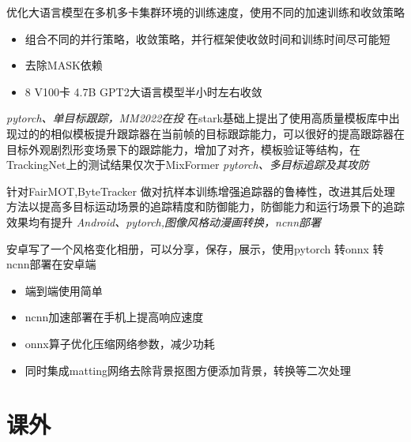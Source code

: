 \documentclass{uniquecv}
\begin{document}
优化大语言模型在多机多卡集群环境的训练速度，使用不同的加速训练和收敛策略
\begin{itemize}
  \item 组合不同的并行策略，收敛策略，并行框架使收敛时间和训练时间尽可能短
  \item 去除MASK依赖
  \item 8 V100卡 4.7B GPT2大语言模型半小时左右收敛
\end{itemize}
\textit{pytorch、单目标跟踪，MM2022在投}
\vspace{0.4ex}
在stark基础上提出了使用高质量模板库中出现过的的相似模板提升跟踪器在当前帧的目标跟踪能力，可以很好的提高跟踪器在目标外观剧烈形变场景下的跟踪能力，增加了对齐，模板验证等结构，在TrackingNet上的测试结果仅次于MixFormer
\textit{pytorch、多目标追踪及其攻防}
\vspace{0.4ex}

针对FairMOT,ByteTracker 做对抗样本训练增强追踪器的鲁棒性，改进其后处理方法以提高多目标运动场景的追踪精度和防御能力，防御能力和运行场景下的追踪效果均有提升
\textit{Android、pytorch,图像风格动漫画转换，ncnn部署}
\vspace{0.4ex}

安卓写了一个风格变化相册，可以分享，保存，展示，使用pytorch 转onnx 转 ncnn部署在安卓端
\begin{itemize}
  \item 端到端使用简单
  \item ncnn加速部署在手机上提高响应速度
  \item onnx算子优化压缩网络参数，减少功耗
  \item 同时集成matting网络去除背景抠图方便添加背景，转换等二次处理
\end{itemize}

\section{课外}
\end{document}
